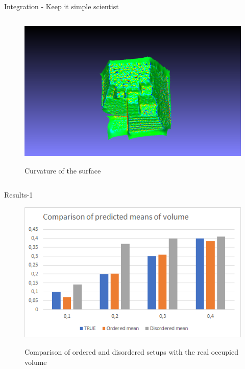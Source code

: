 \documentclass{beamer}
\begin{document}
\begin{frame}{Integration -  Keep it simple scientist}
\begin{columns}
\begin{column}{0.5\textwidth}
\begin{center}
		\begin{figure}
			\includegraphics[width=0.75\linewidth]{Figures/curvature00}
			\label{curv}
			\caption{Curvature of the surface}
		\end{figure}
	\end{center}
\end{column}
\end{columns}



\end{frame}

\begin{frame}{Results-1}

\begin{figure}
	\includegraphics[width=0.95\linewidth]{Figures/chart1}
	\label{ch1}
	\caption{Comparison of ordered and disordered setups with the real occupied volume}
\end{figure}
\end{frame}
\end{document}

